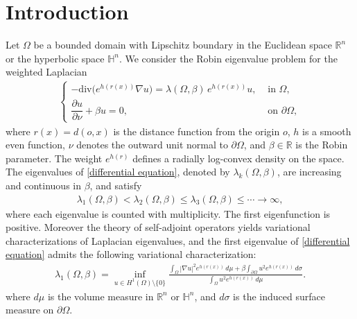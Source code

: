 \documentclass[11pt,leqno]{amsart}
\def\l{\lambda}
\def\p{\partial}
\def\R{\mathbb{R}}
\def \p {\partial}
\numberwithin{equation}{section}
\begin{document}
\section{Introduction}
Let $\Omega$ be a bounded domain with Lipschitz boundary in  the Euclidean space $\R^n$ or  the hyperbolic space $\mathbb{H}^n$. We consider the Robin eigenvalue problem for the weighted Laplacian
\begin{align}\label{differential equation}
    \begin{cases}
        -\mathrm{div} \big(e^{h(r(x))}\nabla u\big)=\lambda(\Omega,\beta)\, e^{h(r(x))} u,  & \text{ in } \Omega, \\
        \dfrac{\partial u}{\partial \nu}+\beta u=0, & \text{ on } \p \Omega,
    \end{cases}
\end{align}
where $r(x)=d(o,x)$ is the  distance function from the origin $o$, $h$ is a smooth even function, $\nu$ denotes the outward unit normal to $\p \Omega$, and $\beta\in \R$ is the Robin parameter. The weight $e^{h(r)}$ defines a radially log-convex density on the space.
The eigenvalues of \eqref{differential equation}, denoted by $\l_{k}(\Omega, \beta)$, are increasing and continuous in $\beta$,  and satisfy
\begin{align*} 
\l_{1}(\Omega, \beta)<\l_{2}(\Omega, \beta ) \le \l_{3}(\Omega, \beta) \le \cdots \rightarrow \infty,
\end{align*}
where each eigenvalue is counted with multiplicity. The first eigenfunction is positive. Moreover the theory of self-adjoint operators yields variational characterizations of Laplacian eigenvalues, and the first  eigenvalue of \eqref{differential equation} admits the following variational characterization:
\begin{align}\label{variational representation}
    \lambda_{1}(\Omega, \beta)=\inf_{u\in H^{1}(\Omega)\setminus\{0\}}\frac{\int_{\Omega}|\nabla u|^{2}e^{h(r(x))}\,d\mu + \beta\int_{\partial \Omega}u^{2}e^{h(r(x))}\,d\sigma}{\int_{\Omega}u^{2}e^{h(r(x))}\,d\mu}.
\end{align}
where $d\mu$ is the volume measure in $\R^n$ or $\mathbb{H}^n$, and  $d\sigma$ is the induced surface measure on $\p \Omega$.
\end{document}
